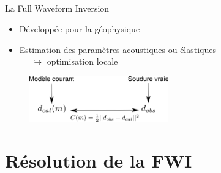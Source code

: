 \documentclass[10pt,xcolor=x11names,compress, notes=show]{beamer}%
\begin{document}
\subsection*{}
\begin{frame}{La Full Waveform Inversion}
	\begin{itemize}
		\item Développée pour la géophysique
		\item Estimation des paramètres acoustiques ou élastiques\\ $~~~~~~\hookrightarrow$ optimisation locale
	\end{itemize}
	\vspace{1cm}
	\begin{figure}
		\centering
		\includegraphics[height=2cm]{img/schema_fwi2.png}
	\end{figure}
	

\end{frame}

%		


\section{Résolution de la FWI}
\end{document}
